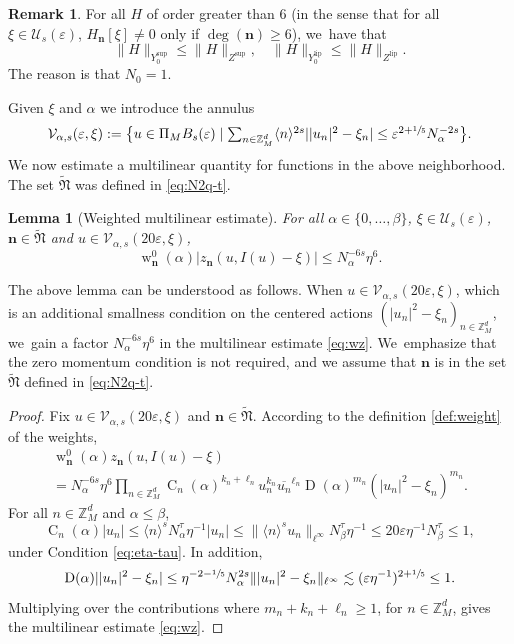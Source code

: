\documentclass[JEP,XML,SOM,Unicode,published]{cedram}
\let\ts\textstyle
\DeclareMathOperator{\rw}{w}
\theoremstyle{plain}
\newtheorem{lemma}[theorem]{Lemma}
\theoremstyle{definition}
\newtheorem{remark}[theorem]{Remark}
\newcommand{\nb}{{\boldsymbol n}}
\newcommand{\Nb}{{\boldsymbol{\mathfrak{N}}}}
\newcommand{\Z}{\mathbb{Z}}
\newcommand{\1}{\mathbf{1}}
\newcommand{\Ysup}[1]{Y_{#1}^{\mathrm{sup}}}
\newcommand{\Ylip}[1]{Y_{#1}^{\mathrm{lip}}}
\let\epsilon\varepsilon
\begin{document}
\begin{remark}
For all $H$ of order greater than 6 (in the sense that for all $\xi\in\mathcal{U}_{s}(\epsilon)$, $H_{\nb}[\xi]\neq0$ only if $\deg(\nb)\geq6$), we~have that
\begin{equation}
\label{eq:alpha=0}
\|H\|_{\Ysup{0}}
\leq \|H\|_{Z^{\mathrm{sup}}},\quad
\|H\|_{\Ylip{0}}
\leq \|H\|_{Z^{\mathrm{lip}}}.
\end{equation}
The reason is that $N_{0}=1$.
\end{remark}
Given $\xi$ and $\alpha$ we introduce the annulus
\begin{equation}
\label{eq:cal-V}\ts
\mathcal{V}_{\alpha,s}(\epsilon,\xi) := \big\{u\in\Pi_{M}B_{s}(\epsilon)\mid \sum_{n\in\Z_{M}^{d}}\langle n\rangle^{2s}||u_n|^2 - \xi_n|\leq \epsilon^{2+\sfrac{1}{5}}N_\alpha^{-2s}\big\}.
\end{equation}
We now estimate a multilinear quantity for functions in the above neighborhood. The set $\widetilde{\Nb}$ was defined in \eqref{eq:N2q-t}.
\begin{lemma}[Weighted multilinear estimate]
\label{lem:wz}
For all $\alpha\in\{0,\dots,\beta\}$, $\xi\in\mathcal{U}_{s}(\epsilon)$, $\nb\in\widetilde{\Nb}$ and $u\in\mathcal{V}_{\alpha,s}(20\epsilon,\xi)$,
\begin{equation}
\label{eq:wz}
\rw_{\nb}^{0}(\alpha)|z_{\nb}(u,I(u)-\xi)|
\leq N_{\alpha}^{-6s}\eta^{6}.
\end{equation}
\end{lemma}
The above lemma can be understood as follows. When $u\in\mathcal{V}_{\alpha,s}(20\epsilon,\xi)$, which is an additional smallness condition on the centered actions $(|u_{n}|^{2}-\xi_{n})_{n\in\Z_{M}^{d}}$, we~gain a factor $N_{\alpha}^{-6s}\eta^{6}$ in the multilinear estimate \eqref{eq:wz}. We~emphasize that the zero momentum condition is not required, and we assume that $\nb$ is in the set $\widetilde{\Nb}$ defined in \eqref{eq:N2q-t}.

\begin{proof}
Fix $u\in\mathcal{V}_{\alpha,s}(20\epsilon,\xi)$ and $\nb\in\widetilde{\Nb}$. According to the definition \ref{def:weight} of the weights,
\begin{multline}
\label{eq:wz2}
\rw_{\nb}^{0}(\alpha)z_{\nb}(u,I(u)-\xi)\\
= N_{\alpha}^{-6s}\eta^{6}\prod_{n\in\Z_{M}^{d}}\operatorname{C}_{n}(\alpha)^{k_{n}+\ell_{n}}u_{n}^{k_{n}}\overline{u_{n}}^{\ell_{n}}\operatorname{D}(\alpha)^{m_{n}}(|u_{n}|^{2}-\xi_{n})^{m_{n}}.
\end{multline}
For all $n\in\Z_{M}^{d}$ and $\alpha\leq\beta$,
\[
\operatorname{C}_{n}(\alpha)|u_{n}|
\leq \langle n\rangle^{s}N_{\alpha}^{\tau}\eta^{-1}|u_{n}|
\leq \|\langle n\rangle^{s}u_{n}\|_{\ell^{\infty}}N_{\beta}^{\tau}\eta^{-1}
\leq 20\epsilon\eta^{-1} N_{\beta}^{\tau}
\leq 1,
\]
under Condition \eqref{eq:eta-tau}. In addition,
\[
\operatorname{D}(\alpha)||u_{n}|^{2}-\xi_{n}| \leq \eta^{-2-\sfrac{1}{5}}N_{\alpha}^{2s}\||u_{n}|^{2}-\xi_{n}\|_{\ell^{\infty}}
\lesssim (\epsilon\eta^{-1})^{2+\sfrac{1}{5}}\leq1.
\]
Multiplying over the contributions where $m_{n}+k_{n}+\ell_{n}\geq1$, for $n\in\Z_{M}^{d}$, gives the multilinear estimate \eqref{eq:wz}.
\end{proof}
\end{document}
